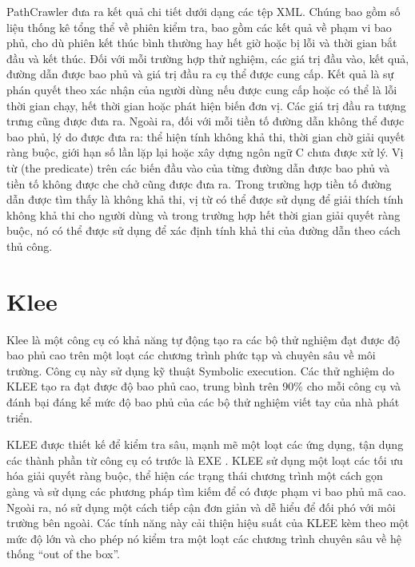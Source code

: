 \documentclass[12pt,a4paper]{report}
\begin{document}
\indent PathCrawler đưa ra kết quả chi tiết dưới dạng các tệp XML. Chúng bao gồm số liệu thống kê tổng thể về phiên kiểm tra, bao gồm các kết quả về phạm vi bao phủ, cho dù phiên kết thúc bình thường hay hết giờ hoặc bị lỗi và thời gian bắt đầu và kết thúc. Đối với mỗi trường hợp thử nghiệm, các giá trị đầu vào, kết quả, đường dẫn được bao phủ và giá trị đầu ra cụ thể được cung cấp. Kết quả là sự phán quyết theo xác nhận của người dùng nếu được cung cấp hoặc có thể là lỗi thời gian chạy, hết thời gian hoặc phát hiện biến đơn vị. Các giá trị đầu ra tượng trưng cũng được đưa ra. Ngoài ra, đối với mỗi tiền tố đường dẫn không thể được bao phủ, lý do được đưa ra: thể hiện tính không khả thi, thời gian chờ giải quyết ràng buộc, giới hạn số lần lặp lại hoặc xây dựng ngôn ngữ C chưa được xử lý. Vị từ (the predicate) trên các biến đầu vào của từng đường dẫn được bao phủ và tiền tố không được che chở cũng được đưa ra. Trong trường hợp tiền tố đường dẫn được tìm thấy là không khả thi, vị từ có thể được sử dụng để giải thích tính không khả thi cho người dùng và trong trường hợp hết thời gian giải quyết ràng buộc, nó có thể được sử dụng để xác định tính khả thi của đường dẫn theo cách thủ công.
\section{Klee}
Klee là một công cụ có khả năng tự động tạo ra các bộ thử nghiệm đạt được độ bao phủ cao trên một loạt các chương trình phức tạp và chuyên sâu về môi trường. Công cụ này sử dụng kỹ thuật Symbolic execution. Các thử nghiệm do KLEE tạo ra đạt được độ bao phủ cao, trung bình trên 90\% cho mỗi công cụ và đánh bại đáng kể mức độ bao phủ của các bộ thử nghiệm viết tay của nhà phát triển.

\indent KLEE được thiết kế để kiểm tra sâu, mạnh mẽ một loạt các ứng dụng, tận dụng các thành phần từ công cụ có trước là EXE \cite{cadar2008exe}. KLEE sử dụng một loạt các tối ưu hóa giải quyết ràng buộc, thể hiện các trạng thái chương trình một cách gọn gàng và sử dụng các phương pháp tìm kiếm để có được phạm vi bao phủ mã cao. Ngoài ra, nó sử dụng một cách tiếp cận đơn giản và dễ hiểu để đối phó với môi trường bên ngoài. Các tính năng này cải thiện hiệu suất của KLEE kèm theo một mức độ lớn và cho phép nó kiểm tra một loạt các chương trình chuyên sâu về hệ thống “out of the box”.
\end{document}
